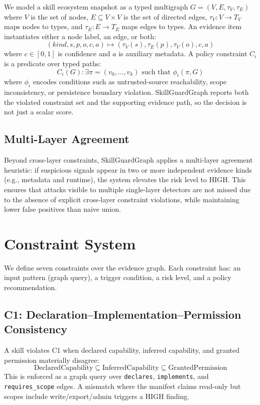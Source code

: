 \documentclass[10pt]{article}
\begin{document}
We model a skill ecosystem snapshot as a typed multigraph
$G = (V, E, \tau_V, \tau_E)$ where $V$ is the set of nodes,
$E \subseteq V \times V$ is the set of directed edges,
$\tau_V: V \rightarrow T_V$ maps nodes to types, and
$\tau_E: E \rightarrow T_E$ maps edges to types.
An evidence item instantiates either a node label, an edge, or both:
\[
(kind, s, p, o, c, a) \mapsto (\tau_V(s), \tau_E(p), \tau_V(o), c, a)
\]
where $c \in [0,1]$ is confidence and $a$ is auxiliary metadata.
A policy constraint $C_i$ is a predicate over typed paths:
\[
C_i(G) : \exists \pi = (v_0, \dots, v_k) \text{ such that } \phi_i(\pi, G)
\]
where $\phi_i$ encodes conditions such as untrusted-source reachability,
scope inconsistency, or persistence boundary violation.
SkillGuardGraph reports both the violated constraint set and the supporting
evidence path, so the decision is not just a scalar score.

\subsection{Multi-Layer Agreement}

Beyond cross-layer constraints, SkillGuardGraph applies a multi-layer agreement heuristic: if suspicious signals appear in two or more independent evidence kinds (e.g., metadata and runtime), the system elevates the risk level to HIGH. This ensures that attacks visible to multiple single-layer detectors are not missed due to the absence of explicit cross-layer constraint violations, while maintaining lower false positives than naive union.

\section{Constraint System}
\label{sec:constraints}

We define seven constraints over the evidence graph. Each constraint has: an input pattern (graph query), a trigger condition, a risk level, and a policy recommendation.

\subsection{C1: Declaration--Implementation--Permission Consistency}

A skill violates C1 when declared capability, inferred capability, and granted permission materially disagree:
\begin{equation}
\text{DeclaredCapability} \subseteq \text{InferredCapability} \subseteq \text{GrantedPermission}
\end{equation}
This is enforced as a graph query over \texttt{declares}, \texttt{implements}, and \texttt{requires\_scope} edges. A mismatch where the manifest claims read-only but scopes include write/export/admin triggers a HIGH finding.
\end{document}
